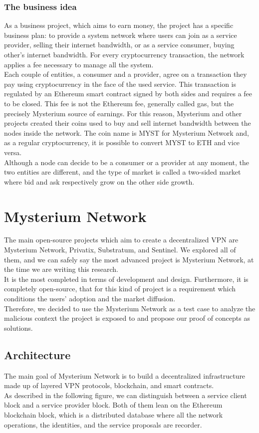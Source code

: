 \documentclass[12pt]{article}
\begin{document}
	\subsubsection{The business idea}
	As a business project, which aims to earn money, the project has a specific business plan: to provide a system network where users can join as a service provider, selling their internet bandwidth, or as a service consumer, buying other's internet bandwidth. For every cryptocurrency transaction, the network applies a fee necessary to manage all the system.\\
	Each couple of entities, a consumer and a provider, agree on a transaction they pay using cryptocurrency in the face of the used service. This transaction is regulated by an Ethereum smart contract signed by both sides and requires a fee to be closed. This fee is not the Ethereum fee, generally called gas, but the precisely Mysterium source of earnings. For this reason, Mysterium and other projects created their coins used to buy and sell internet bandwidth between the nodes inside the network. The coin name is MYST for Mysterium Network and, as a regular cryptocurrency, it is possible to convert MYST to ETH and vice versa.\\
	Although a node can decide to be a consumer or a provider at any moment, the two entities are different, and the type of market is called a two-sided market where bid and ask respectively grow on the other side growth.
	\bigbreak

	\newpage
	\section{Mysterium Network}
	The main open-source projects which aim to create a decentralized VPN are Mysterium Network, Privatix, Substratum, and Sentinel. We explored all of them, and we can safely say the most advanced project is Mysterium Network, at the time we are writing this research.\\It is the most completed in terms of development and design. Furthermore, it is completely open-source, that for this kind of project is a requirement which conditions the users' adoption and the market diffusion.\\
	Therefore, we decided to use the Mysterium Network as a test case to analyze the malicious context the project is exposed to and propose our proof of concepts as solutions.
	
	\subsection{Architecture}
	The main goal of Mysterium Network is to build a decentralized infrastructure made up of layered VPN protocols, blockchain, and smart contracts.\\
	As described in the following figure, we can distinguish between a service client block and a service provider block. Both of them lean on the Ethereum blockchain block, which is a distributed database where all the network operations, the identities, and the service proposals are recorder.\\
	\bigbreak
	
\end{document}
